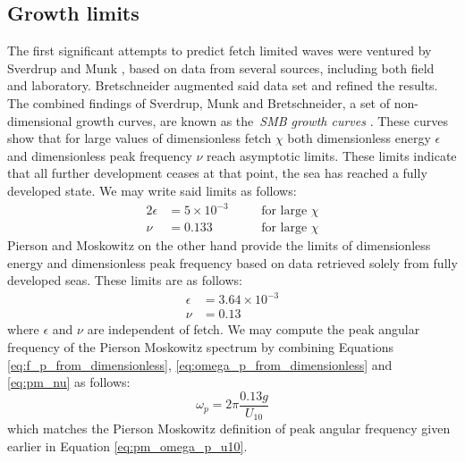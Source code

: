 \subsection{Growth limits}
%
The first significant attempts to predict fetch limited waves were ventured by
Sverdrup and Munk\cite{book:breakersandsurf1944}
\cite{book:breakersandsurfsupplement1945}, based on data from several sources, 
including both field and laboratory. Bretschneider 
\cite{article:Bretschneider1952} augmented said data set and refined the 
results. The combined findings of Sverdrup, Munk and Bretschneider, a set of 
non-dimensional growth curves, are known as the~\emph{SMB growth curves}
\cite{book:cerc1977}. These curves show that for large values of dimensionless 
fetch $\chi$ both dimensionless energy $\epsilon$ and dimensionless peak 
frequency $\nu$ reach asymptotic limits. These limits indicate that all further 
development ceases at that point, the sea has reached a fully developed state. 
We may write said limits as follows:
\begin{alignat}{2}
 \epsilon &= 5\times10^{-3} \quad && \text{for large } \chi \\
 \nu &= 0.133 \quad && \text{for large } \chi
\end{alignat}
Pierson and Moskowitz on the other hand provide the limits of dimensionless 
energy and dimensionless peak frequency based on data retrieved solely from 
fully developed seas. These limits are as follows:
\begin{align}
 \epsilon &= 3.64\times10^{-3} \\
 \nu &= 0.13 \label{eq:pm_nu}
\end{align}
where $\epsilon$ and $\nu$ are independent of fetch. We may compute the peak
angular frequency of the Pierson Moskowitz spectrum by combining Equations
\ref{eq:f_p_from_dimensionless}, \ref{eq:omega_p_from_dimensionless} and
\ref{eq:pm_nu} as follows:
\begin{equation}
 \omega_p = 2\pi\frac{0.13g}{U_{10}}
\end{equation}
which matches the Pierson Moskowitz definition of peak angular frequency
given earlier in Equation \ref{eq:pm_omega_p_u10}.\\

